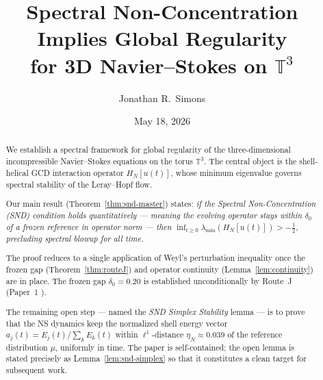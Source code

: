 \documentclass[12pt]{amsart}
\theoremstyle{definition}
\newcommand{\lmin}{\lambda_{\min}}
\begin{document}

\title[SND Implies Global Regularity for 3D Navier--Stokes]{%
  Spectral Non-Concentration Implies Global Regularity\\
  for 3D Navier--Stokes on $\mathbb T^3$}

\author{Jonathan R.\ Simons}
\address{Prime Field Technologies LLC, Savannah, Georgia}
\date{May 18, 2026}

\begin{abstract}
We establish a spectral framework for global regularity of the
three-dimensional incompressible Navier--Stokes equations on the
torus $\mathbb T^3$.
The central object is the shell-helical GCD interaction operator
$H_N[u(t)]$, whose minimum eigenvalue governs spectral stability of
the Leray--Hopf flow.

Our main result (Theorem~\ref{thm:snd-master}) states:
\emph{if the Spectral Non-Concentration (SND) condition holds
quantitatively — meaning the evolving operator stays within
$\delta_0$ of a frozen reference in operator norm — then
$\inf_{t\ge0}\lmin(H_N[u(t)])>-\tfrac{1}{2}$,
precluding spectral blowup for all time.}

The proof reduces to a single application of Weyl's perturbation
inequality once the frozen gap (Theorem~\ref{thm:routeJ}) and
operator continuity (Lemma~\ref{lem:continuity}) are in place.
The frozen gap $\delta_0=0.20$ is established unconditionally by
Route~J (Paper~1 \cite{Simons2026a}).

The remaining open step — named the \emph{SND Simplex Stability}
lemma — is to prove that the NS dynamics keep the normalized shell
energy vector $a_j(t)=E_j(t)/\sum_k E_k(t)$ within $\ell^1$-distance
$\eta_N\approx0.039$ of the reference distribution $\mu$, uniformly
in time.
The paper is self-contained; the open lemma is stated precisely as
Lemma~\ref{lem:snd-simplex} so that it constitutes a clean target
for subsequent work.
\end{abstract}

\maketitle

\end{document}
